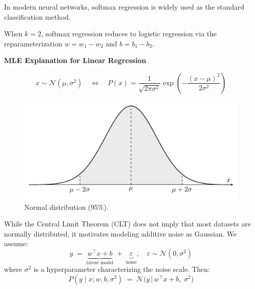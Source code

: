 \documentclass[../main]{subfiles}
\begin{document}
\begin{note}
  In modern neural networks, softmax regression is widely used 
  as the standard classification method.
\end{note}

\begin{remark}
  When $k=2$, softmax regression reduces to logistic regression 
  via the reparameterization $w = w_1 - w_2$ and $b = b_1 - b_2$.
\end{remark}
\begin{example}
  \textbf{MLE Explanation for Linear Regression}
\end{example}
\begin{definition}
    \begin{equation}
        x\sim\mathcal N(\mu,\sigma^2)\quad\Leftrightarrow\quad P(x)=\frac{1}{\sqrt{2\pi\sigma^2}}\exp\left(-\frac{(x-\mu)^2}{2\sigma^2}\right)
    \end{equation}
\end{definition}
\begin{figure}[H]
  \centering
  \includegraphics{../../tikz/2/3.pdf}
  \caption{Normal distribution (95\%).}
  \label{2-lr}
\end{figure}
While the Central Limit Theorem (CLT) does not imply that most datasets are normally distributed, 
it motivates modeling additive noise as Gaussian. We assume:
\begin{equation}
  y \;=\;
  \underbrace{w^\top x + b}_{\text{latent model}}
  \;+\;
  \underbrace{\varepsilon}_{\text{noise}},
  \quad \varepsilon \sim \mathcal N(0,\sigma^2)
\end{equation}
where $\sigma^2$ is a hyperparameter characterizing the noise scale. Then:
\begin{equation}
  P(y \mid x; w,b,\sigma^2) \;=\; \mathcal N\!\big(y \,\big|\, w^\top x + b,\; \sigma^2\big)
\end{equation}
\end{document}
